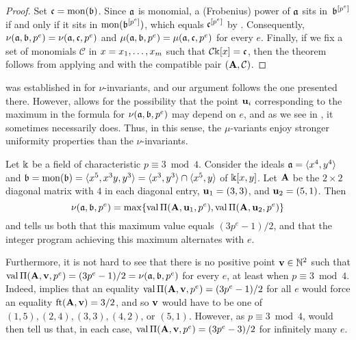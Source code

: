 \documentclass{amsart}
\begin{document}
\begin{proof} 
   Set $\mathfrak{c} = \operatorname{mon}(\mathfrak{b})$.  Since $\mathfrak{a}$ is monomial, a (Frobenius) power of $\mathfrak{a}$ sits in~$\mathfrak{b}^{[p^e]}$ if and only if it sits in $\operatorname{mon}(\mathfrak{b}^{[p^e]})$, which equals $\mathfrak{c}^{[p^e]}$ by .  Consequently, $\nu(\mathfrak{a}, \mathfrak{b}, p^e) = \nu(\mathfrak{a}, \mathfrak{c}, p^e)$ and $\mu(\mathfrak{a}, \mathfrak{b}, p^e) = \mu(\mathfrak{a}, \mathfrak{c}, p^e)$ for every $e$.  Finally, if we fix a set of monomials $\mathcal{C}$ in $x = x_1, \ldots, x_m$ such that $\mathcal{C} \Bbbk[x] = \mathfrak{c}$, then the theorem follows from applying  and  with the compatible pair $(\mathbf{A}, \mathcal{C})$.
   \end{proof}

 was established in \cite[Section~4]{budur+mustata+saito.roots_bs_polys_monomial} for $\nu$-invariants, and our argument follows the one presented there.  However,  allows for the possibility that the point $\mathbf{u}_i$ corresponding to the maximum in the formula for $\nu(\mathfrak{a}, \mathfrak{b}, p^e)$ may  depend on $e$, and as we see in , it sometimes necessarily does.  Thus, in this sense, the $\mu$-variants enjoy stronger uniformity properties than the $\nu$-invariants.


\begin{example} 
\label{less uniformity for nu: E}
Let $\Bbbk$ be a field of characteristic $p \equiv 3 \bmod 4$. Consider the ideals $\mathfrak{a} = \langle x^4, y^4 \rangle$ and $\mathfrak{b} = \operatorname{mon}(\mathfrak{b}) = \langle x^5, x^3 y, y^3 \rangle = \langle x^3, y^3 \rangle \cap \langle x^5, y \rangle$ of $\Bbbk[x,y]$.  Let $\mathbf{A}$ be the $2 \times 2$ diagonal matrix with $4$ in each diagonal entry, $\mathbf{u}_1=(3,3)$, and $\mathbf{u}_2=(5,1)$.  
Then 
\[ \nu(\mathfrak{a}, \mathfrak{b}, p^e) = \max \{ \operatorname{val} \Pi(\mathbf{A},\mathbf{u}_1, p^e), \operatorname{val} \Pi(\mathbf{A}, \mathbf{u}_2, p^e) \} \] and  tells us both that this maximum value equals $(3p^e-1)/2$, and that the integer program achieving this maximum alternates with $e$.

Furthermore, it is not hard to see that there is no positive point $\mathbf{v} \in \mathbb{N}^2$ such that $\operatorname{val} \Pi(\mathbf{A}, \mathbf{v}, p^e) = (3p^e-1)/2 = \nu(\mathfrak{a}, \mathfrak{b}, p^e)$ for every $e$, at least when $p \equiv 3 \bmod 4$.  Indeed,  implies that an equality $\operatorname{val} \Pi(\mathbf{A}, \mathbf{v}, p^e) = (3p^e-1)/2$ for all $e$ would force an equality $\operatorname{ft}(\mathbf{A}, \mathbf{v}) = 3/2$, and so $\mathbf{v}$ would have to be one of $(1,5), (2,4), (3,3), (4,2)$, or $(5,1)$.  However, as $p \equiv 3 \bmod 4$,     would then tell us that, in each case, $\operatorname{val} \Pi(\mathbf{A}, \mathbf{v}, p^e) = (3p^e-3)/2$ for infinitely many $e$.
\end{example}
\end{document}
